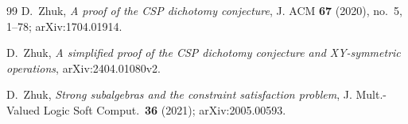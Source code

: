 \documentclass[11pt]{article}
\begin{document}
\begin{thebibliography}{99}
 D.~Zhuk, \emph{A proof of the CSP dichotomy conjecture},
  J. ACM \textbf{67} (2020), no.~5, 1--78; arXiv:1704.01914.

 D.~Zhuk, \emph{A simplified proof of the CSP dichotomy
  conjecture and XY-symmetric operations}, arXiv:2404.01080v2.

 D.~Zhuk, \emph{Strong subalgebras and the constraint
  satisfaction problem}, J. Mult.-Valued Logic Soft Comput.\ \textbf{36} (2021);
  arXiv:2005.00593.

\end{thebibliography}
\end{document}
